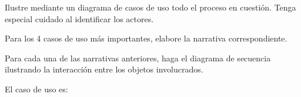 \documentclass[11pt,letterpaper]{article}
\begin{document}
\begin{spacing}{1.2}
\begin{Problem}
\begin{ProbPart}[difficulty={10}]
Ilustre mediante un diagrama de casos de uso todo el proceso en cuestión. Tenga especial
cuidado al identificar los actores.

\end{ProbPart}

\begin{ProbPart}[difficulty={30}]

Para los 4 casos de uso más importantes, elabore la narrativa correspondiente.

\end{ProbPart}

\begin{ProbPart}[difficulty={30}]

Para cada una de las narrativas anteriores, haga el diagrama de secuencia ilustrando la interacción entre los objetos involucrados.

\end{ProbPart}

\end{Problem}

\begin{NewAnswer}

\begin{ProbPart}[difficulty={10}]

El caso de uso es:


\end{ProbPart}
\end{NewAnswer}
\end{spacing}
\end{document}

